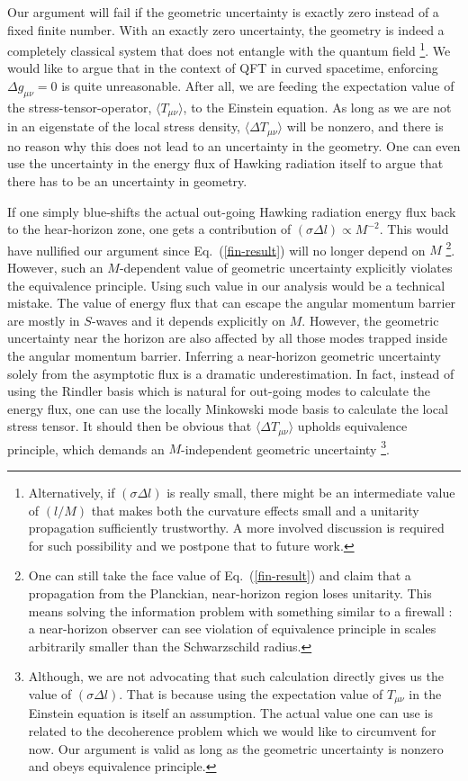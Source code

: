 \documentclass[aps,showpacs,onecolumn,floats,prd,superscriptaddress,nofootinbib]{revtex4-1}
\begin{document}
Our argument will fail if the geometric uncertainty is exactly zero instead of a fixed finite number.
With an exactly zero uncertainty, the geometry is indeed a completely classical system that does not entangle with the quantum field
\footnote{Alternatively, if $(\sigma\Delta l)$ is really small, there might be an intermediate value of $(l/M)$ that makes both the curvature effects small and a unitarity propagation sufficiently trustworthy.
A more involved discussion is required for such possibility and we postpone that to future work.}.
We would like to argue that in the context of QFT in curved spacetime, enforcing $\Delta g_{\mu\nu}=0$ is quite unreasonable.
After all, we are feeding the expectation value of the stress-tensor-operator, $\langle T_{\mu\nu}\rangle$, to the Einstein equation. 
As long as we are not in an eigenstate of the local stress density, $\langle\Delta T_{\mu\nu}\rangle$ will be nonzero, and there is no reason why this does not lead to an uncertainty in the geometry.
One can even use the uncertainty in the energy flux of Hawking radiation itself to argue that there has to be an uncertainty in geometry.

If one simply blue-shifts the actual out-going Hawking radiation energy flux back to the hear-horizon zone, one gets a contribution of $(\sigma\Delta l)\propto M^{-2}$.
This would have nullified our argument since Eq.~(\ref{fin-result}) will no longer depend on $M$
\footnote{One can still take the face value of Eq.~(\ref{fin-result}) and claim that a propagation from the Planckian, near-horizon region loses unitarity.
This means solving the information problem with something similar to a firewall \cite{AMPS}:  a near-horizon observer can see violation of equivalence principle in scales arbitrarily smaller than the Schwarzschild radius.}.
However, such an $M$-dependent value of geometric uncertainty explicitly violates the equivalence principle.
Using such value in our analysis would be a technical mistake.
The value of energy flux that can escape the angular momentum barrier are mostly in $S$-waves and it depends explicitly on $M$.
However, the geometric uncertainty near the horizon are also affected by all those modes trapped inside the angular momentum barrier.
Inferring a near-horizon geometric uncertainty solely from the asymptotic flux is a dramatic underestimation.
In fact, instead of using the Rindler basis which is natural for out-going modes to calculate the energy flux, one can use the locally Minkowski mode basis to calculate the local stress tensor.
It should then be obvious that $\langle\Delta T_{\mu\nu}\rangle$ upholds equivalence principle, which demands an $M$-independent geometric uncertainty
\footnote{Although, we are not advocating that such calculation directly gives us the value of $(\sigma\Delta l)$.
That is because using the expectation value of $T_{\mu\nu}$ in the Einstein equation is itself an assumption.
The actual value one can use is related to the decoherence problem which we would like to circumvent for now.
Our argument is valid as long as the geometric uncertainty is nonzero and obeys equivalence principle.}.
 
\end{document}
